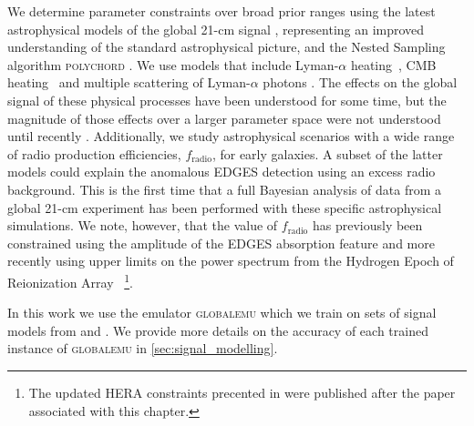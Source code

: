 We determine parameter constraints over broad prior ranges using the latest astrophysical models of the global 21-cm signal \citep{Reis2020, Reis_sta_2021}, representing an improved understanding of the standard astrophysical picture, and the Nested Sampling algorithm \citep{skilling_nested_2004} \textsc{polychord} \citep{Handley2015a, Handley2015b}. We use models that include Lyman-$\alpha$ heating~\citep{Madau1997, chen_lah_2004, furlanetto_scattering_2006, Chuzhoy2007}, CMB heating~\citep{Venumadhav2018} and multiple scattering of Lyman-$\alpha$ photons \citep{semelin_b_lyman-alpha_2007, Naoz2008, baek_s_simulated_2009, visbal_impact_2018, molaro_artist_2019, reis_mapping_2020}. The effects on the global signal of these physical processes have been understood for some time, but the magnitude of those effects over a larger parameter space were not understood until recently \citep{Villanueva2020, Mittal2021, Reis_sta_2021}. Additionally, we study astrophysical scenarios with a wide range of radio production efficiencies, $f_\mathrm{radio}$, for early galaxies. A subset of the latter models could explain the anomalous EDGES detection \cite{Bowman_edges_2018} using an excess radio background. This is the first time that a full Bayesian analysis of data from a global 21-cm experiment has been performed with these specific astrophysical simulations. We note, however, that the value of $f_\mathrm{radio}$ has previously been constrained using the amplitude of the EDGES absorption feature \citep{Reis2020} and more recently using upper limits on the power spectrum from the Hydrogen Epoch of Reionization Array~\citep[HERA,][]{HERA_2022b} \footnote{The updated HERA constraints precented in \cite{HERA_2022c} were published after the paper associated with this chapter.}.

In this work we use the emulator \textsc{globalemu} \citep[see \cref{ch:globalemu}, ][]{Bevins_globalemu_2021} which we train on sets of signal models from \cite{Reis2020} and \cite{Reis_sta_2021}. %
We provide more details on the accuracy of each trained instance of \textsc{globalemu} in \cref{sec:signal_modelling}.

